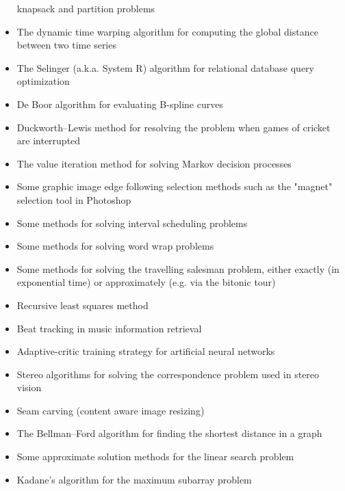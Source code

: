 \begin{slide}
\begin{PauseHighLight}
\begin{itemize}
    knapsack and partition problems 
  \item The dynamic time warping algorithm for computing the global
    distance between two time series 
  \item The Selinger (a.k.a. System R) algorithm for relational database
    query optimization 
  \item De Boor algorithm for evaluating B-spline curves
  \item Duckworth–Lewis method for resolving the problem when games of
    cricket are interrupted 
  \item The value iteration method for solving Markov decision processes
  \item Some graphic image edge following selection methods such as the
    "magnet" selection tool in Photoshop 
  \item Some methods for solving interval scheduling problems
  \item Some methods for solving word wrap problems
  \item Some methods for solving the travelling salesman problem, either
    exactly (in exponential time) or approximately (e.g. via the bitonic
    tour) 
  \item Recursive least squares method
  \item Beat tracking in music information retrieval
  \item Adaptive-critic training strategy for artificial neural networks
  \item Stereo algorithms for solving the correspondence problem used in
    stereo vision 
  \item Seam carving (content aware image resizing)
  \item The Bellman–Ford algorithm for finding the shortest distance in
    a graph 
  \item Some approximate solution methods for the linear search problem
  \item Kadane's algorithm for the maximum subarray problem
  \end{itemize}
\end{PauseHighLight}

\end{slide}


